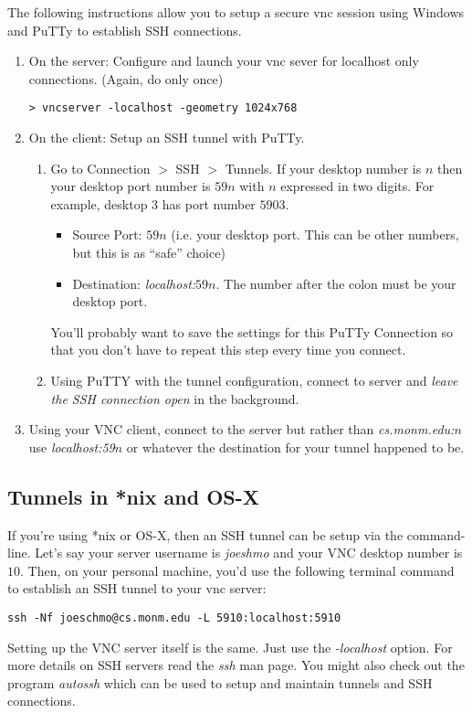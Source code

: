 \documentclass[10pt]{article}
\begin{document}
The following instructions allow you to setup a secure vnc session using Windows and PuTTy to establish SSH connections.
\begin{enumerate}
\item On the server: Configure and launch your vnc sever for localhost only connections. (Again, do only once)
\begin{verbatim}
> vncserver -localhost -geometry 1024x768
\end{verbatim}
\item On the client: Setup an SSH tunnel with PuTTy. 
\begin{enumerate}
\item Go to Connection $>$ SSH $>$ Tunnels. If your desktop number is $n$ then your desktop port number is $59n$ with $n$ expressed in two digits. For example, desktop $3$ has port number $5903$. 
\begin{itemize}
\item Source Port: $59n$ (i.e. your desktop port. This can be other numbers, but this is as ``safe'' choice)
\item Destination: \textit{localhost:$59n$}.  The number after the colon must be your desktop port.
\end{itemize}
You'll probably want to save the settings for this PuTTy Connection so that you don't have to repeat this step every time you connect.
\item Using PuTTY with the tunnel configuration, connect to server and \textit{leave the SSH connection open} in the background.
\end{enumerate}
\item Using your VNC client, connect to the server but rather than \textit{cs.monm.edu:$n$} use \textit{localhost:59$n$} or whatever the destination for your tunnel happened to be.
\end{enumerate}

\subsection*{Tunnels in *nix and OS-X}
If you're using *nix or OS-X, then an SSH tunnel can be setup via the command-line. Let's say your server username is \textit{joeshmo} and your VNC desktop number is $10$. Then, on your personal machine, you'd use the following terminal command to establish an SSH tunnel to your vnc server:
\begin{verbatim}
ssh -Nf joeschmo@cs.monm.edu -L 5910:localhost:5910
\end{verbatim}
Setting up the VNC server itself is the same. Just use the \textit{-localhost} option. For more details on SSH servers read the \textit{ssh} man page. You might also check out the program \textit{autossh} which can be used to setup and maintain tunnels and SSH connections. 
\end{document}
